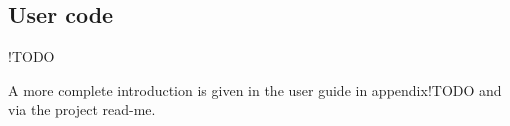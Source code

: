 

\subsection{User code} \label{impl:user-code}

!TODO

A more complete introduction is given in the user guide in appendix!TODO and via the project read-me.~\cite{tapioca}






